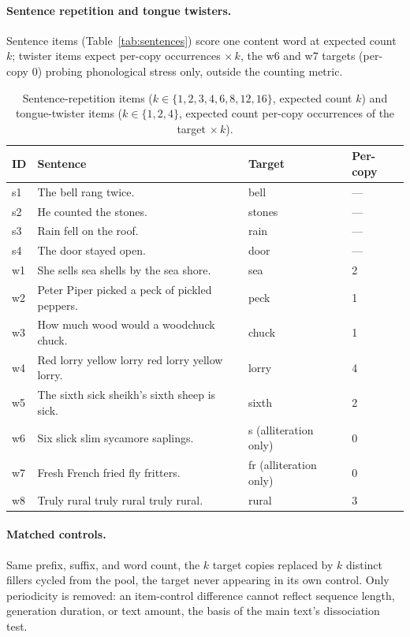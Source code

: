\paragraph{Sentence repetition and tongue twisters.} Sentence items
(Table~\ref{tab:sentences}) score one content word at expected count $k$;
twister items expect per-copy occurrences $\times\,k$, the w6 and w7
targets (per-copy $0$) probing phonological stress only, outside the
counting metric.
\begin{table}[p]
\centering
\caption{Sentence-repetition items ($k \in \{1,2,3,4,6,8,12,16\}$,
expected count $k$) and tongue-twister items ($k\in\{1,2,4\}$, expected
count per-copy occurrences of the target $\times\,k$).}
\label{tab:sentences}\label{tab:twisters}
\small
\begin{tabular}{@{}lp{11.5cm}ll@{}}
\toprule
ID & Sentence & Target & Per-copy \\
\midrule
s1 & The bell rang twice. & bell & --- \\
s2 & He counted the stones. & stones & --- \\
s3 & Rain fell on the roof. & rain & --- \\
s4 & The door stayed open. & door & --- \\
\midrule
w1 & She sells sea shells by the sea shore. & sea & 2 \\
w2 & Peter Piper picked a peck of pickled peppers. & peck & 1 \\
w3 & How much wood would a woodchuck chuck. & chuck & 1 \\
w4 & Red lorry yellow lorry red lorry yellow lorry. & lorry & 4 \\
w5 & The sixth sick sheikh's sixth sheep is sick. & sixth & 2 \\
w6 & Six slick slim sycamore saplings. & s (alliteration only) & 0 \\
w7 & Fresh French fried fly fritters. & fr (alliteration only) & 0 \\
w8 & Truly rural truly rural truly rural. & rural & 3 \\
\bottomrule
\end{tabular}
\end{table}

\paragraph{Matched controls.} Same prefix, suffix, and word count, the
$k$ target copies replaced by $k$ distinct fillers cycled from the pool,
the target never appearing in its own control. Only periodicity is
removed: an item-control difference cannot reflect sequence length,
generation duration, or text amount, the basis of the main text's
dissociation test.

